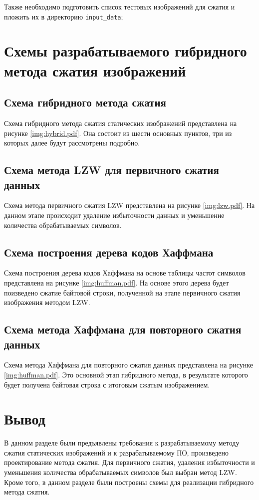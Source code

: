 Также необходимо подготовить список тестовых изображений для сжатия и пложить их в директорию \texttt{input\_data};


\section{Схемы разрабатываемого гибридного метода сжатия изображений}

\subsection{Схема гибридного метода сжатия}

Схема гибридного метода сжатия статических изображений представлена на рисунке \ref{img:hybrid.pdf}. Она состоит из шести основных пунктов, три из которых далее будут рассмотрены подробно.

\clearpage
\subsection{Схема метода LZW для первичного сжатия данных}

Схема метода первичного сжатия LZW представлена на рисунке \ref{img:lzw.pdf}. На данном этапе происходит удаление избыточности данных и уменьшение количества обрабатываемых символов.

\clearpage
\subsection{Схема построения дерева кодов Хаффмана}

Схема построения дерева кодов Хаффмана на основе таблицы частот символов представлена на рисунке \ref{img:huffman.pdf}. На основе этого дерева будет поизведено сжатие байтовой строки, полученной на этапе первичного сжатия изображения методом LZW.

\clearpage
\subsection{Схема метода Хаффмана для повторного сжатия данных}

Схема метода Хаффмана для повторного сжатия данных представлена на рисунке \ref{img:huffman.pdf}. Это основной этап гибридного метода, в результате которого будет получена байтовая строка с итоговым сжатым изображением.

\section*{Вывод}

В данном разделе были предъявлены требования к разрабатываемому методу сжатия статических изображений и к разрабатываемому ПО, произведено проектирование метода сжатия. Для первичного сжатия, удаления избыточности и уменьшения количества обрабатываемых символов был выбран метод LZW. Кроме того, в данном разделе были построены схемы для реализации гибридного метода сжатия.
